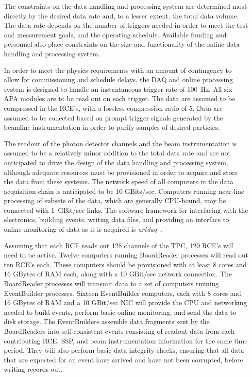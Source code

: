 
The constraints on the data handling and processing system are
determined most directly by the desired data rate and, to a lesser
extent, the total data volume.  The data rate depends on the number of
triggers needed in order to meet the test and measurement goals, and
the operating schedule.  Available funding and personnel also place
constraints on the size and functionality of the online data handling
and processing system.

In order to meet the physics requirements with an amount of
contingency to allow for commissioning and schedule delays, the DAQ
and online processing system is designed to handle an instantaneous
trigger rate of 100~Hz.  All six APA modules are to be read out on
each trigger.  The data are assumed to be compressed in the RCE's,
with a lossless compression ratio of 5.  Data are assumed to be
collected based on prompt trigger signals generated by the beamline
instrumentation in order to purify samples of desired particles.

The readout of the photon detector channels and the beam
instrumentation is assumed to be a relatively minor addition to the
total data rate and are not anticipated to drive the design of the
data handling and processing system, although adequate resources must
be provisioned in order to acquire and store the data from these
systems.  The network speed of all computers in the data acquisition
chain is anticipated to be 10 GBits/sec.  Computers running near-line
processing of subsets of the data, which are generally CPU-bound, may
be connected with 1~GBit/sec links.  The software framework for
interfacing with the electronics, building events, writing data files,
and providing an interface to online monitoring of data as it is
acquired is {\it artdaq}~\cite{artdaq}.

Assuming that each RCE reads out 128 channels of the TPC, 120 RCE's
will need to be active.  Twelve computers running BoardReader
processes will read out ten RCE's each.  These computers should be
provisioned with at least 8 cores and 16 GBytes of RAM each, along
with a 10 GBit/sec network connection.  The BoardReader processes will
transmit data to a set of computers running EventBuilder processes.
Sixteen EventBuilder computers, each with 8 cores and 16 GBytes of RAM
and a 10 GBit/sec NIC will provide the CPU and networking needed to
build events, perform basic online monitoring, and send the data to
disk storage.  The EventBuilders assemble data fragments sent by the
BoardReaders into self-consistent events consisting of readout data
from each contributing RCE, SSP, and beam instrumentation information
for the same time period.  They will also perform basic data integrity
checks, ensuring that all data that are expected for an event have
arrived and have not been corrupted, before writing records out.

